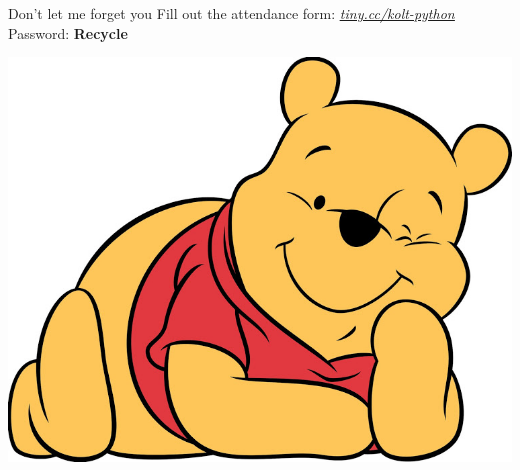     \begin{frame}{Don't let me forget you}
        \pause
        \Large
        Fill out the attendance form: \href{https://tiny.cc/kolt-python}{\underline{\textit{tiny.cc/kolt-python}}}\\
        \pause
            Password: \textbf{Recycle}
        \pause
        \begin{center}
            \includegraphics[height=0.60\textheight]{images/winnie.jpg}                
        \end{center}
    \end{frame}

